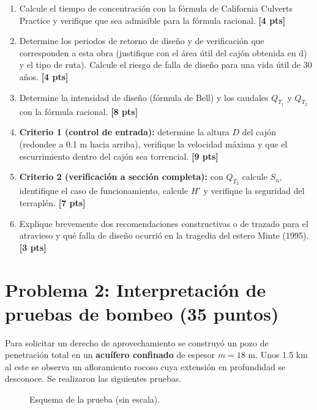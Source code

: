 \documentclass[11pt,letterpaper]{article}
\newcommand{\pts}[1]{\hfill\textbf{[#1 pts]}}
\begin{document}
\begin{enumerate}[label=\alph*)]
\item Calcule el tiempo de concentración con la fórmula de California Culverts Practice y verifique que sea admisible para la fórmula racional. \pts{4}
\item Determine los periodos de retorno de diseño y de verificación que corresponden a esta obra (justifique con el área útil del cajón obtenida en d) y el tipo de ruta). Calcule el riesgo de falla de diseño para una vida útil de 30 años. \pts{4}
\item Determine la intensidad de diseño (fórmula de Bell) y los caudales $Q_{T_1}$ y $Q_{T_2}$ con la fórmula racional. \pts{8}
\item \textbf{Criterio 1 (control de entrada):} determine la altura $D$ del cajón (redondee a 0.1 m hacia arriba), verifique la velocidad máxima y que el escurrimiento dentro del cajón sea torrencial. \pts{9}
\item \textbf{Criterio 2 (verificación a sección completa):} con $Q_{T_2}$ calcule $S_n$, identifique el caso de funcionamiento, calcule $H'$ y verifique la seguridad del terraplén. \pts{7}
\item Explique brevemente dos recomendaciones constructivas o de trazado para el atravieso y qué falla de diseño ocurrió en la tragedia del estero Minte (1995). \pts{3}
\end{enumerate}

\section*{Problema 2: Interpretación de pruebas de bombeo (35 puntos)}

Para solicitar un derecho de aprovechamiento se construyó un pozo de penetración total en un
\textbf{acuífero confinado} de espesor $m=18$ m. Unos 1.5 km al este se observa un afloramiento
rocoso cuya extensión en profundidad se desconoce. Se realizaron las siguientes pruebas.

\begin{figure}[H]
\centering
{}
\caption{Esquema de la prueba (sin escala).}
\end{figure}
\end{document}
